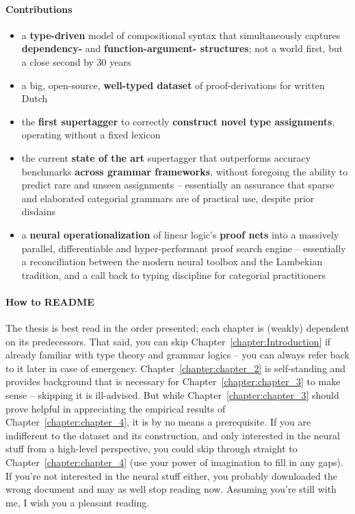 {\paragraph{Contributions}
\begin{itemize}
\item a \textbf{type-driven} model of compositional syntax that simultaneously captures \textbf{dependency-} and \textbf{function-argument- structures}; not a world first, but a close second by 30 years
\item a big, open-source, \textbf{well-typed dataset} of proof-derivations for written Dutch
\item the \textbf{first supertagger} to correctly \textbf{construct novel type assignments}, operating without a fixed lexicon
\item the current \textbf{state of the art} supertagger that outperforms accuracy benchmarks \textbf{across grammar frameworks}, without foregoing the ability to predict rare and unseen assignments -- essentially an assurance that sparse and elaborated categorial grammars are of practical use, despite prior disdains
\item a \textbf{neural operationalization} of linear logic's \textbf{proof nets} into a massively parallel, differentiable and hyper-performant proof search engine -- essentially a reconciliation between the modern neural toolbox and the Lambekian tradition, and a call back to typing discipline for categorial practitioners
\end{itemize}

\paragraph{How to README}
The thesis is best read in the order presented; each chapter is (weakly) dependent on its predecessors.
That said, you can skip Chapter~\ref{chapter:Introduction} if already familiar with type theory and grammar logics -- you can always refer back to it later in case of emergency.
Chapter~\ref{chapter:chapter_2} is self-standing and provides background that is necessary for Chapter~\ref{chapter:chapter_3} to make sense -- skipping it is ill-advised.
But while Chapter~\ref{chapter:chapter_3} should prove helpful in appreciating the empirical results of Chapter~\ref{chapter:chapter_4}, it is by no means a prerequisite.
If you are indifferent to the dataset and its construction, and only interested in the neural stuff from a high-level perspective, you could skip through straight to Chapter~\ref{chapter:chapter_4} (use your power of imagination to fill in any gaps).
If you're not interested in the neural stuff either, you probably downloaded the wrong document and may as well stop reading now.
Assuming you're still with me, I wish you a pleasant reading.

}
